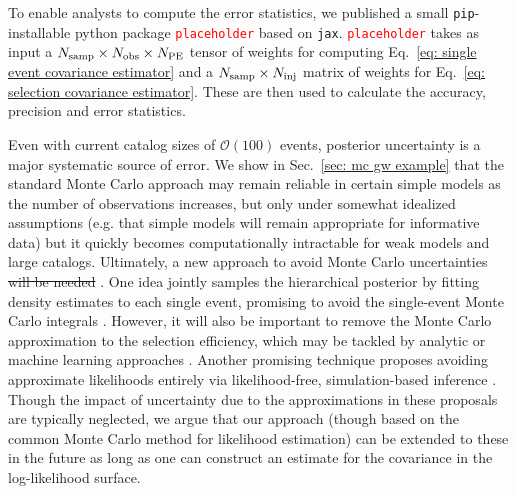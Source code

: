 \documentclass[%
 reprint,
 amsmath,amssymb,
 aps,nofootinbib,nobibnotes,onecolumn,prd
]{revtex4-2}
\providecommand{\DIFaddtex}[1]{{\protect\color{blue}\uwave{#1}}} %
\providecommand{\DIFdeltex}[1]{{\protect\color{red}\sout{#1}}}                      %
\providecommand{\DIFaddbegin}{} %
\providecommand{\DIFaddend}{} %
\providecommand{\DIFdelbegin}{} %
\providecommand{\DIFdelend}{} %
\providecommand{\DIFadd}[1]{\texorpdfstring{\DIFaddtex{#1}}{#1}} %
\providecommand{\DIFdel}[1]{\texorpdfstring{\DIFdeltex{#1}}{}} %
\newcommand{\DIFscaledelfig}{0.5}
\newlength{\DIFdelgraphicswidth} %
\newlength{\DIFdelgraphicsheight} %
\newcommand{\DIFaddincludegraphics}[2][]{{\color{blue}\fbox{\DIFOincludegraphics[#1]{#2}}}} %
\newcommand{\DIFdelincludegraphics}[2][]{%
\sbox{\DIFdelgraphicsbox}{\DIFOincludegraphics[#1]{#2}}%
\settoboxwidth{\DIFdelgraphicswidth}{\DIFdelgraphicsbox} %
\settoboxtotalheight{\DIFdelgraphicsheight}{\DIFdelgraphicsbox} %
\scalebox{\DIFscaledelfig}{%
\parbox[b]{\DIFdelgraphicswidth}{\usebox{\DIFdelgraphicsbox}\\[-\baselineskip] \rule{\DIFdelgraphicswidth}{0em}}\llap{\resizebox{\DIFdelgraphicswidth}{\DIFdelgraphicsheight}{%
\setlength{\unitlength}{\DIFdelgraphicswidth}%
\begin{picture}(1,1)%
\thicklines\linethickness{2pt} %
{\color[rgb]{1,0,0}\put(0,0){\framebox(1,1){}}}%
{\color[rgb]{1,0,0}\put(0,0){\line( 1,1){1}}}%
{\color[rgb]{1,0,0}\put(0,1){\line(1,-1){1}}}%
\end{picture}%
}\hspace*{3pt}}} %
} %
\DeclareRobustCommand{\DIFaddbegin}{\DIFOaddbegin \let\includegraphics\DIFaddincludegraphics} %
\DeclareRobustCommand{\DIFaddend}{\DIFOaddend \let\includegraphics\DIFOincludegraphics} %
\DeclareRobustCommand{\DIFdelbegin}{\DIFOdelbegin \let\includegraphics\DIFdelincludegraphics} %
\DeclareRobustCommand{\DIFdelend}{\DIFOaddend \let\includegraphics\DIFOincludegraphics} %
\begin{document}
To enable analysts to compute the error statistics, we published a small \texttt{pip}-installable python package \textcolor{red}{\texttt{placeholder}} based on \texttt{jax}. \textcolor{red}{\texttt{placeholder}} takes as input a $N_{\rm samp}\times N_{\rm obs}\times N_{\rm PE}$ tensor of weights for computing Eq.~\ref{eq: single event covariance estimator} and a $N_{\rm samp}\times N_{\rm inj}$ matrix of weights for Eq.~\ref{eq: selection covariance estimator}. These are then used to calculate the accuracy, precision and error statistics. 


Even with current catalog sizes of $\mathcal{O}(100)$ events, posterior uncertainty is a major systematic source of error. We show in Sec.~\ref{sec: mc gw example} that the standard Monte Carlo approach may remain reliable in certain simple models as the number of observations increases, but only under somewhat idealized assumptions (e.g. that simple models will remain appropriate for informative data) but it quickly becomes computationally intractable for weak models and large catalogs. Ultimately, a new approach to avoid Monte Carlo uncertainties \DIFdelbegin \DIFdel{will be needed} \DIFdelend \DIFaddbegin \DIFadd{entirely may become necessary} \DIFaddend . One idea jointly samples the hierarchical posterior by fitting density estimates to each single event, promising to avoid the single-event Monte Carlo integrals \citep{Rinaldi:2021bhm,Callister:2022qwb,Hussain:2024qzl,Mancarella:2025uat}. However, it will also be important to remove the Monte Carlo approximation to the selection efficiency, which may be tackled by analytic or machine learning approaches \citep{Lorenzo-Medina:2024opt, Talbot:2020oeu, Gerosa:2020pgy, Callister:2024qyq}. Another promising technique proposes avoiding approximate likelihoods entirely via likelihood-free, simulation-based inference \citep{Leyde:2023iof}.
Though the impact of uncertainty due to the approximations in these proposals are typically neglected, we argue that our approach (though based on the common Monte Carlo method for likelihood estimation) can be extended to these in the future as long as one can construct an estimate for the covariance in the log-likelihood surface. 
\end{document}
